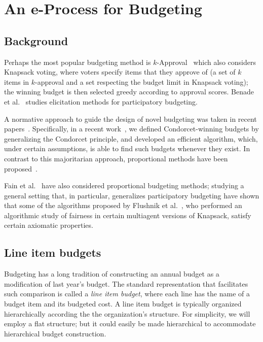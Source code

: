 \documentclass[sigconf]{aamas}  %
\begin{document}
\section{An e-Process for Budgeting}
\label{section:e-process budgeting}


\subsection{Background}

Perhaps the most popular budgeting method is $k$-Approval~\cite{goel2015knapsack} which also considers Knapsack voting, where voters specify items that they approve of (a set of $k$ items in $k$-approval and a set respecting the budget limit in Knapsack voting); the winning budget is then selected greedy according to approval scores.
%
Benade et al.~\cite{benade2017preference} studies elicitation methods for participatory budgeting.

A normative approach to guide the design of novel budgeting was taken in recent papers~\cite{condorcetbudgeting,aussieone}.
Specifically, in a recent work~\cite{condorcetbudgeting}, we defined Condorcet-winning budgets by generalizing the Condorcet principle, and developed an efficient algorithm, which, under certain assumptions, is able to find such budgets whenever they exist.
%
In contrast to this majoritarian approach, proportional methods have been proposed~\cite{aussieone}.

Fain et al.~\cite{fain2016core} have also considered proportional budgeting methods;
studying a general setting that, in particular, generalizes participatory budgeting have shown that some of the algorithms proposed by Flushnik et al.~\cite{fluschnik2017fair},
who performed an algorithmic study of fairness in certain multiagent versions of Knapsack,
satisfy certain axiomatic properties.


\subsection{Line item budgets}

Budgeting has a long tradition of constructing an annual budget as a modification of last year's budget.  The standard representation that facilitates such comparison is called a \emph{line item budget}, where each line has the name of a budget item and its budgeted cost.  A line item budget is typically organized hierarchically according the the organization's structure.  For simplicity, we will employ a flat structure; but it could easily be made hierarchical to accommodate hierarchical budget construction.
\end{document}
